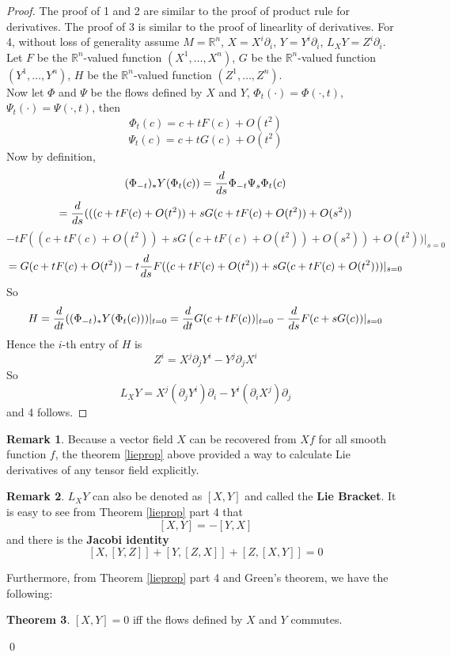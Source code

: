 \documentclass{article}
\theoremstyle{definition}
\newtheorem{thm}{Theorem}[section]
\newtheorem{rmk}[thm]{Remark}
\begin{document}
\begin{proof}
  The proof of 1 and 2 are similar to the proof of product rule for derivatives. The proof of 3 is similar to the proof of linearlity of derivatives. For 4, without loss of generality assume $M=\mathbb{R}^n$, $X=X^i\partial_i$, $Y=Y^i\partial_i$, $L_X Y=Z^i\partial_i$. Let $F$ be the $\mathbb{R}^n$-valued function $(X^1, \dots, X^n)$, $G$ be the $\mathbb{R}^n$-valued function $(Y^1, \dots, Y^n)$, $H$ be the $\mathbb{R}^n$-valued function $(Z^1, \dots, Z^n)$.\\
  
  Now let $\Phi$ and $\Psi$ be the flows defined by $X$ and $Y$, $\Phi_t(\cdot)=\Phi(\cdot, t)$, $\Psi_t(\cdot)=\Psi(\cdot, t)$, then
  \[\Phi_t(c)=c+tF(c)+O(t^2)\]
  \[\Psi_t(c)=c+tG(c)+O(t^2)\]
  Now by definition, 
  \[(\Phi_{-t})_*Y(\Phi_t(c))={d\over ds}\Phi_{-t}\Psi_s\Phi_t(c)\]
  \[={d\over ds}(((c+tF(c)+O(t^2))+sG(c+tF(c)+O(t^2))+O(s^2))\]
  \[-tF((c+tF(c)+O(t^2))+sG(c+tF(c)+O(t^2))+O(s^2))+O(t^2))|_{s=0}\]
  \[=G(c+tF(c)+O(t^2))-t{d\over ds}F((c+tF(c)+O(t^2))+sG(c+tF(c)+O(t^2)))|_{s=0}\]
  So
  \[H={d\over dt}((\Phi_{-t})_*Y(\Phi_t(c)))|_{t=0}={d\over dt}G(c+tF(c))|_{t=0}-{d\over ds}F(c+sG(c))|_{s=0}\]
  Hence the $i$-th entry of $H$ is
  \[Z^i=X^j\partial_jY^i-Y^j\partial_jX^i\]
  So
  \[L_X Y=X^j(\partial_jY^i)\partial_i-Y^i(\partial_iX^j)\partial_j\]
  and 4 follows.
\end{proof}

\begin{rmk}
    Because a vector field $X$ can be recovered from $Xf$ for all smooth function $f$, the theorem \ref{lieprop} above provided a way to calculate Lie derivatives of any tensor field explicitly. 
\end{rmk}

\begin{rmk}
    $L_X Y$ can also be denoted as $[X, Y]$ and called the {\bf Lie Bracket}. It is easy to see from Theorem \ref{lieprop} part 4 that
    \[[X, Y]=-[Y, X]\]
    and there is the {\bf Jacobi identity}
    \[[X, [Y, Z]]+[Y, [Z, X]]+[Z, [X, Y]]=0\]
\end{rmk}
    
    Furthermore, from Theorem \ref{lieprop} part 4 and Green's theorem, we have the following:

    \begin{thm}\label{flowcomm}
      $[X, Y]=0$ iff the flows defined by $X$ and $Y$ commutes.
    \end{thm}\qed
\end{document}

